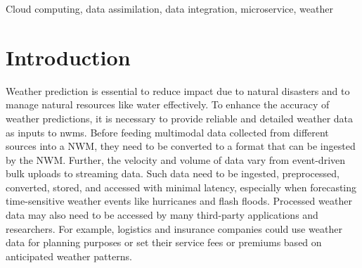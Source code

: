 \documentclass[conference]{IEEEtran}
\newcommand{\dbc}[1]{\todo[author=Dilum, inline, color=blue!40]{#1}}
\begin{document}

\begin{IEEEkeywords}
Cloud computing, data assimilation, data integration, microservice, weather
\end{IEEEkeywords}

\section{Introduction}
\label{pse:Introduction}

Weather prediction is essential to reduce impact due to natural disasters and to manage natural resources like water effectively. To enhance the accuracy of weather predictions, it is necessary to provide reliable and detailed weather data as inputs to \acrfull{nwm}s. Before feeding multimodal data collected from different sources into a NWM, they need to be converted to a format that can be ingested by the NWM. Further, the velocity and volume of data vary from event-driven bulk uploads to streaming data. Such data need to be ingested, preprocessed, converted, stored, and accessed with minimal latency, especially when forecasting time-sensitive weather events like hurricanes and flash floods. Processed weather data may also need to be accessed by many third-party applications and researchers. For example, logistics and insurance companies could use weather data for planning purposes or set their service fees or premiums based on anticipated weather patterns.
\end{document}
